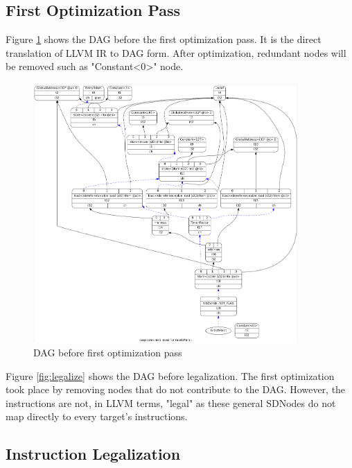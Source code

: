 \subsection{First Optimization Pass}
Figure \ref{fig:combine1} shows the DAG before the first optimization pass. It is the direct translation of LLVM IR to DAG form. After optimization, redundant nodes will be removed such as "Constant<0>" node.
\begin{figure}
    \centering
    \includegraphics[width=0.9\textwidth]{path_instruction/madd_dag_combine1.png}
    \caption{DAG before first optimization pass}
    \label{fig:combine1}
\end{figure}

Figure \ref{fig:legalize} shows the DAG before legalization. The first optimization took place by removing nodes that do not contribute to the DAG. However, the instructions are not, in LLVM terms, "legal" as these general SDNodes do not map directly to every target's instructions.  

\subsection{Instruction Legalization}

